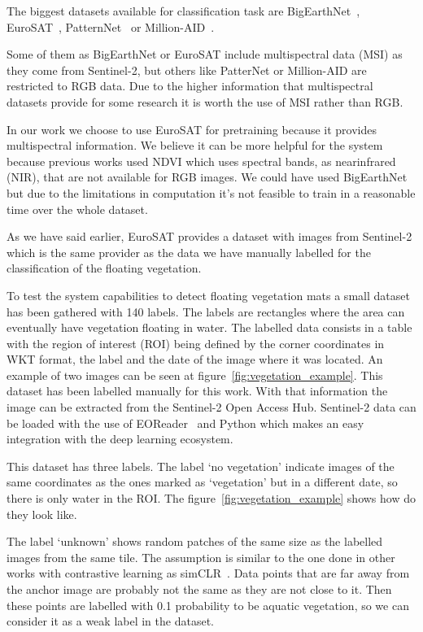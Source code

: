 \documentclass[conference]{IEEEtran}
\begin{document}
    The biggest datasets available for classification task are BigEarthNet~\cite{bigearthnet}, EuroSAT~\cite{helber2019eurosat},
    PatternNet~\cite{patternet} or Million-AID~\cite{millionaid}.

    Some of them as BigEarthNet or EuroSAT include multispectral data (MSI) as they come from Sentinel-2, but others like PatterNet or Million-AID are restricted to RGB data.
    Due to the higher information that multispectral datasets provide for some research it is worth the use of MSI rather than RGB\@.

    In our work we choose to use EuroSAT for pretraining because it provides multispectral information.
    We believe it can be more helpful for the system because previous works used NDVI which uses spectral bands, as nearinfrared (NIR), that are not available for RGB images.
    We could have used BigEarthNet but due to the limitations in computation it's not feasible to train in a reasonable time over the whole dataset.

    As we have said earlier, EuroSAT provides a dataset with images from Sentinel-2 which is the same provider as the data
    we have manually labelled for the classification of the floating vegetation.

    To test the system capabilities to detect floating vegetation mats a small dataset has been gathered with 140 labels.
    The labels are rectangles where the area can eventually have vegetation floating in water.
    The labelled data consists in a table with the region of interest (ROI) being defined by the corner coordinates in WKT format, the label and the date
    of the image where it was located.
    An example of two images can be seen at figure~\ref{fig:vegetation_example}.
    This dataset has been labelled manually for this work.
    With that information the image can be extracted from the Sentinel-2 Open Access Hub.
    Sentinel-2 data can be loaded with the use of EOReader~\cite{eoreader_paper} and Python which makes an easy integration with the deep learning ecosystem.

    This dataset has three labels.
    The label `no vegetation' indicate images of the same coordinates as the ones marked as `vegetation' but in a different date, so there is only water in the ROI\@.
    The figure~\ref{fig:vegetation_example} shows how do they look like.

    The label `unknown' shows random patches of the same size as the labelled images from the same tile.
    The assumption is similar to the one done in other works with contrastive learning as simCLR~\cite{chen2020simple, jean2019tile2vec}.
    Data points that are far away from the anchor image are probably not the same as they are not close to it.
    Then these points are labelled with 0.1 probability to be aquatic vegetation, so we can consider it as a weak label in the dataset.
\end{document}
